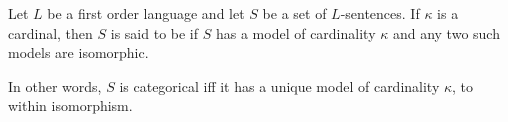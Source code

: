 \documentclass[12pt]{article}
\begin{document}
Let $L$ be a first order language and let $S$ be a set of $L$-sentences.  If $\kappa$ is a cardinal, then $S$ is said to be \emph{} if $S$ has a model of cardinality $\kappa$ and any two such models are isomorphic.

In other words, $S$ is categorical iff it has a unique model of cardinality $\kappa$, to within isomorphism.
\end{document}
